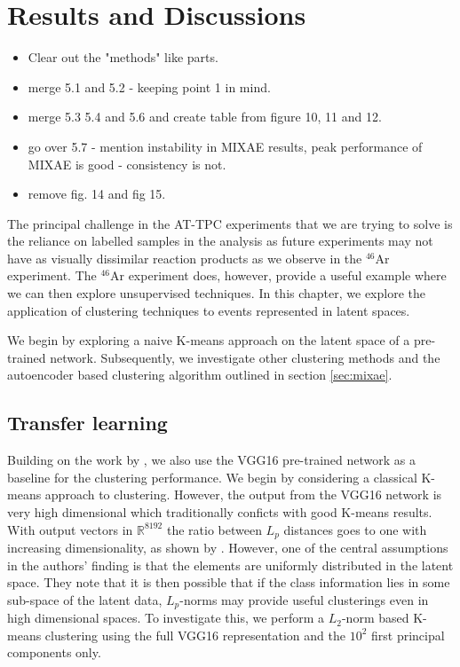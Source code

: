 \documentclass[review,number,sort&compress]{elsarticle}
\newcommand{\R}{\mathbb{R}}
\begin{document}
\section{Results and Discussions}\label{sec:results}
\begin{itemize}
\item Clear out the "methods" like parts.
\item merge 5.1 and 5.2 - keeping point 1 in mind.
\item merge 5.3 5.4 and 5.6 and create table from figure 10, 11 and 12. 
\item go over 5.7 - mention instability in MIXAE results, peak performance of MIXAE is good - consistency is not. 
\item remove fig. 14 and fig 15.
\end{itemize}

The principal challenge in the AT-TPC experiments that we are trying to solve is the reliance on labelled samples in the analysis as future experiments may not have as visually dissimilar reaction products  as we observe in the ${}^{46}$Ar experiment.  The  ${}^{46}$Ar experiment does, however, provide a useful example where we can then explore unsupervised techniques. In this chapter, we explore the application of clustering techniques to events represented in latent spaces. 

We begin by exploring a naive K-means approach on the latent space of a pre-trained network. Subsequently, we investigate other clustering methods and the autoencoder based clustering algorithm outlined in section \ref{sec:mixae}.

\subsection{Transfer learning}
Building on the work by \citet{Kuchera2019}, we also use the VGG16 pre-trained network as a baseline for the clustering performance. We begin by considering a classical K-means approach to clustering. However, the output from the VGG16 network is very high dimensional which traditionally conficts with good K-means results. With output vectors in $\R^{8192}$ the ratio between $L_p$ distances goes to one with increasing dimensionality, as shown by \citet{Aggarwal}. However, one of the central assumptions in the authors' finding is that the elements are uniformly distributed in the latent space. They note that it is then possible that if the class information lies in some sub-space of the latent data, $L_p$-norms may provide useful clusterings even in high dimensional spaces. To investigate this, we perform a $L_2$-norm based K-means clustering using the full VGG16 representation and the $10^2$ first principal components only. 
\end{document}

